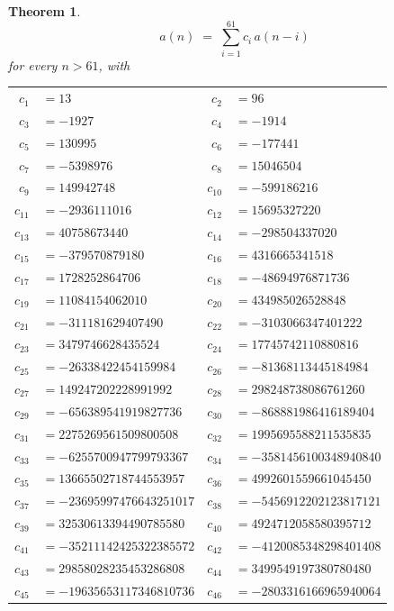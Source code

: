 \documentclass[11pt,a4paper]{article}
\theoremstyle{plain}
\newtheorem{theorem}{Theorem}
\theoremstyle{definition}
\begin{document}
\begin{theorem}
\[
a(n)\;=\;\sum_{i=1}^{61}c_i\,a(n-i)
\]
for every $n>61$, with
\begin{center}\footnotesize
\begin{tabular}{r@{\,}l@{\qquad}r@{\,}l}
$c_{1}$ & $=13$ & $c_{2}$ & $=96$ \\
$c_{3}$ & $=-1927$ & $c_{4}$ & $=-1914$ \\
$c_{5}$ & $=130995$ & $c_{6}$ & $=-177441$ \\
$c_{7}$ & $=-5398976$ & $c_{8}$ & $=15046504$ \\
$c_{9}$ & $=149942748$ & $c_{10}$ & $=-599186216$ \\
$c_{11}$ & $=-2936111016$ & $c_{12}$ & $=15695327220$ \\
$c_{13}$ & $=40758673440$ & $c_{14}$ & $=-298504337020$ \\
$c_{15}$ & $=-379570879180$ & $c_{16}$ & $=4316665341518$ \\
$c_{17}$ & $=1728252864706$ & $c_{18}$ & $=-48694976871736$ \\
$c_{19}$ & $=11084154062010$ & $c_{20}$ & $=434985026528848$ \\
$c_{21}$ & $=-311181629407490$ & $c_{22}$ & $=-3103066347401222$ \\
$c_{23}$ & $=3479746628435524$ & $c_{24}$ & $=17745742110880816$ \\
$c_{25}$ & $=-26338422454159984$ & $c_{26}$ & $=-81368113445184984$ \\
$c_{27}$ & $=149247202228991992$ & $c_{28}$ & $=298248738086761260$ \\
$c_{29}$ & $=-656389541919827736$ & $c_{30}$ & $=-868881986416189404$ \\
$c_{31}$ & $=2275269561509800508$ & $c_{32}$ & $=1995695588211535835$ \\
$c_{33}$ & $=-6255700947799793367$ & $c_{34}$ & $=-3581456100348940840$ \\
$c_{35}$ & $=13665502718744553957$ & $c_{36}$ & $=4992601559661045450$ \\
$c_{37}$ & $=-23695997476643251017$ & $c_{38}$ & $=-5456912202123817121$ \\
$c_{39}$ & $=32530613394490785580$ & $c_{40}$ & $=4924712058580395712$ \\
$c_{41}$ & $=-35211142425322385572$ & $c_{42}$ & $=-4120085348298401408$ \\
$c_{43}$ & $=29858028235453286808$ & $c_{44}$ & $=3499549197380780480$ \\
$c_{45}$ & $=-19635653117346810736$ & $c_{46}$ & $=-2803316166965940064$ \\

\end{tabular}
\end{center}
\end{theorem}
\end{document}
